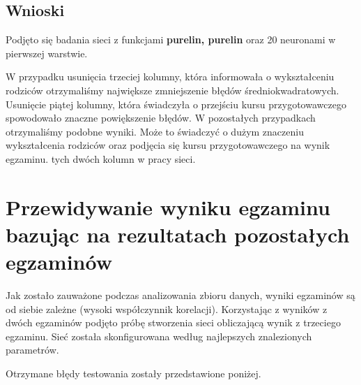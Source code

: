 \documentclass[12pt]{article}
\begin{document}
\subsection{Wnioski}
Podjęto się badania sieci z funkcjami \textbf{purelin, purelin} oraz 20 neuronami w pierwszej warstwie. 

W przypadku usunięcia trzeciej kolumny, która informowała o wykształceniu rodziców otrzymaliśmy największe zmniejszenie błędów średniokwadratowych. Usunięcie piątej kolumny, która świadczyła o przejściu kursu przygotowawczego spowodowało znaczne powiększenie błędów. W pozostałych przypadkach otrzymaliśmy podobne wyniki. Może to świadczyć o dużym znaczeniu wykształcenia rodziców oraz podjęcia się kursu przygotowawczego na wynik egzaminu. tych dwóch kolumn w pracy sieci.

\pagebreak
\section{Przewidywanie wyniku egzaminu bazując na rezultatach pozostałych egzaminów}
Jak zostało zauważone podczas analizowania zbioru danych, wyniki egzaminów są od siebie zależne (wysoki współczynnik korelacji). Korzystając z wyników z dwóch egzaminów podjęto próbę stworzenia sieci obliczającą wynik z trzeciego egzaminu. Sieć została skonfigurowana według najlepszych znalezionych parametrów.

Otrzymane błędy testowania zostały przedstawione poniżej.
\end{document}
